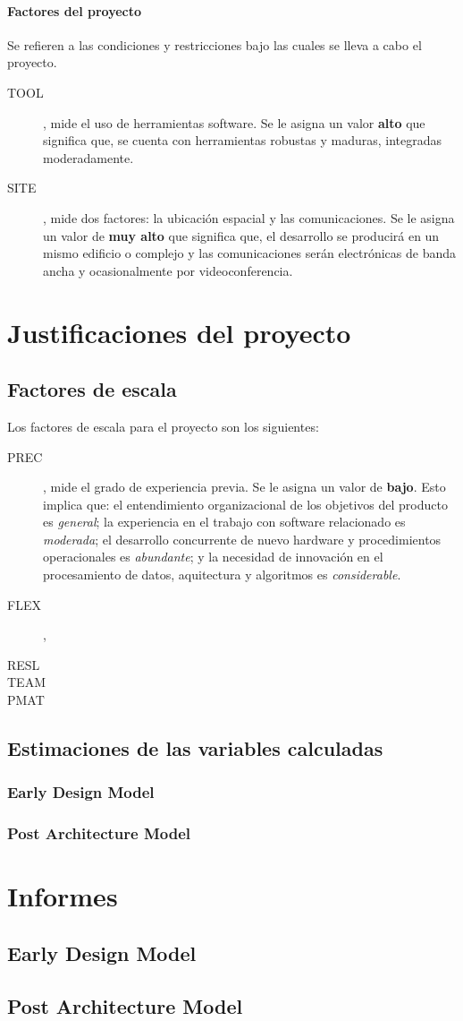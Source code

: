 \documentclass[11pt,a4paper,spanish,twoside]{book}
\begin{document}
\subsubsection{Factores del proyecto}
Se refieren a las condiciones y restricciones bajo las cuales se lleva a cabo
el proyecto.
\begin{description}
\item[TOOL], mide el uso de herramientas software. Se le asigna un valor
\textbf{alto} que significa que, se cuenta con herramientas robustas y
maduras, integradas moderadamente.
\item[SITE], mide dos factores: la ubicación espacial y las comunicaciones.
Se le asigna un valor de \textbf{muy alto} que significa que, el desarrollo
se producirá en un mismo edificio o complejo y las comunicaciones serán
electrónicas de banda ancha y ocasionalmente por videoconferencia.
\end{description}

\chapter{Justificaciones del proyecto}
\section{Factores de escala}
Los factores de escala para el proyecto son los siguientes:
\begin{description}
\item[PREC], mide el grado de experiencia previa. Se le asigna un valor de
\textbf{bajo}. Esto implica que: el entendimiento organizacional de los objetivos del producto es \emph{general}; la experiencia en el trabajo con
software relacionado es \emph{moderada}; el desarrollo concurrente de nuevo
hardware y procedimientos operacionales es \emph{abundante}; y la necesidad
de innovación en el procesamiento de datos, aquitectura y algoritmos es
\emph{considerable}.

\item[FLEX], 

\item[RESL]

\item[TEAM]

\item[PMAT]

\end{description}
\section{Estimaciones de las variables calculadas}
\subsection{Early Design Model}
\subsection{Post Architecture Model}


\chapter{Informes}
\section{Early Design Model}
\section{Post Architecture Model}
\end{document}
